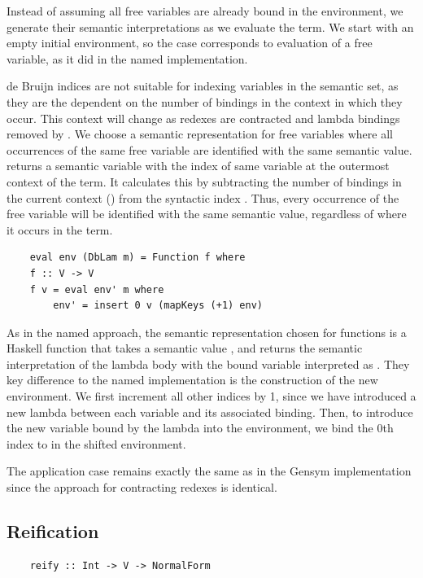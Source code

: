 Instead of assuming all free variables are already bound in the environment, we generate their semantic interpretations as we evaluate the term. We start with an empty initial environment, so the  case corresponds to evaluation of a free variable, as it did in the named implementation. 


de Bruijn indices are not suitable for indexing variables in the semantic set, as they are the dependent on the number of bindings in the context in which they occur. This context will change as redexes are contracted and lambda bindings removed by . We choose a semantic representation for free variables where all occurrences of the same free variable are identified with the same semantic value.
 returns a semantic variable with the index of same variable at the outermost context of the term. It calculates this by subtracting the number of bindings in the current context () from the syntactic index . Thus, every occurrence of the free variable will be identified with the same semantic value, regardless of where it occurs in the term. 

\begin{lstlisting}
    eval env (DbLam m) = Function f where
    f :: V -> V
    f v = eval env' m where
        env' = insert 0 v (mapKeys (+1) env)
\end{lstlisting}

As in the named approach, the semantic representation chosen for functions is a Haskell function that takes a semantic value , and returns the semantic interpretation of the lambda body with the bound variable interpreted as . They key difference to the named implementation is the construction of the new environment. We first increment all other indices by 1, since we have introduced a new lambda between each variable and its associated binding. Then, to introduce the new variable bound by the lambda into the environment, we bind the 0th index to  in the shifted environment.

The application case remains exactly the same as in the Gensym implementation since the approach for contracting redexes is identical.

\subsection{Reification}

\begin{lstlisting}
    reify :: Int -> V -> NormalForm
\end{lstlisting}

